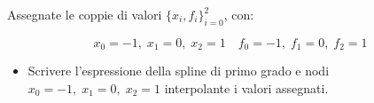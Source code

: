 Assegnate le coppie di valori $\{x_i,f_i \}_{i=0}^2$, con:

$$x_0=-1, \; x_1=0, \; x_2=1 \quad f_0=-1, \; f_1=0, \; f_2=1$$

\begin{itemize}
\item Scrivere l'espressione della spline di primo grado e nodi
$x_0=-1, \; x_1=0, \; x_2=1$ interpolante i valori assegnati.

\end{itemize}
